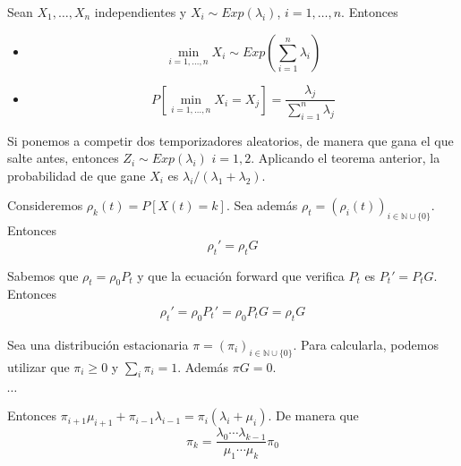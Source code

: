 \documentclass[PREyA.tex]{subfiles}
\begin{document}
\begin{theorem}
Sean $X_1,\dotsc,X_n$ independientes y $X_i \sim Exp(\lambda_i)$, $i=1,\dotsc,n$. Entonces
\begin{itemize}
\item 
$$
\min_{i=1,\dotsc,n} X_i  \sim Exp\left(\sum_{i=1}^n\lambda_i\right)
$$
\item
$$
P\left[\min_{i=1,\dotsc,n} X_i = X_j\right] = \frac{\lambda_j}{\sum_{i=1}^n \lambda_j}
$$
\end{itemize}
\end{theorem}
\begin{nota}
Si ponemos a competir dos temporizadores aleatorios, de manera que gana el que salte antes, entonces $Z_i \sim Exp(\lambda_i)$ $i=1,2$. Aplicando el teorema anterior, la probabilidad de que gane $X_i$ es $\lambda_i / (\lambda_1 + \lambda_2)$.
\end{nota}

\begin{prop}
Consideremos $\rho_k(t)= P[X(t)=k]$. Sea además $\rho_t = (\rho_i(t))_{i \in \mathbb{N}\cup\{0\}}$. Entonces
$$
\rho_t'=\rho_t G
$$
\end{prop}
\begin{dem}
Sabemos que $\rho_t = \rho_0 P_t$ y que la ecuación forward que verifica $P_t$ es $P_t' = P_t G$. Entonces
\begin{align*}
\rho_t' = \rho_0P_t' = \rho_0 P_t G = \rho_t G
\end{align*}
\end{dem}

\begin{nota}
Sea una distribución estacionaria $\pi = (\pi_i)_{i \in \mathbb{N}\cup\{0\}}$. Para calcularla, podemos utilizar que $\pi_i\geq 0$ y $\sum_i \pi_i =1$. Además $\pi G = 0$.


\begin{center}
 $\cdots$

\end{center}
Entonces $\pi_{i+1}\mu_{i+1} + \pi_{i-1}\lambda_{i-1} = \pi_i (\lambda_i+\mu_i)$. De manera que
$$
\pi_k = \frac{\lambda_0 \cdots \lambda_{k-1}}{\mu_1 \cdots \mu_k } \pi_0
$$

\end{nota}
\end{document}
